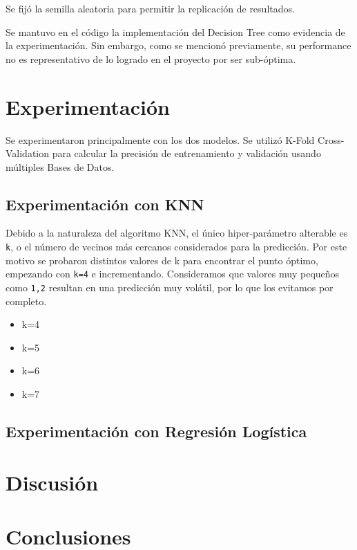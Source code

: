 \documentclass[conference]{IEEEtran}
\begin{document}
Se fijó la semilla aleatoria para permitir la replicación de resultados.

Se mantuvo en el código la implementación del Decision Tree como evidencia de la experimentación. Sin embargo, como se mencionó previamente, su performance no es representativo de lo logrado en el proyecto por ser sub-óptima.

\section{Experimentación}
Se experimentaron principalmente con los dos modelos. Se utilizó K-Fold Cross-Validation para calcular la precisión de entrenamiento y validación usando múltiples Bases de Datos.

\subsection{Experimentación con KNN}
Debido a la naturaleza del algoritmo KNN, el único hiper-parámetro alterable es \texttt{k}, o el número de vecinos más cercanos considerados para la predicción. Por este motivo se probaron distintos valores de k para encontrar el punto óptimo, empezando con \texttt{k=4} e incrementando. Consideramos que valores muy pequeños como \texttt{1,2} resultan en una predicción muy volátil, por lo que los evitamos por completo.

\begin{itemize}
\item k=4
\item k=5
\item k=6
\item k=7
\end{itemize}

\subsection{Experimentación con Regresión Logística}


\section{Discusión}


\section{Conclusiones}
\end{document}
